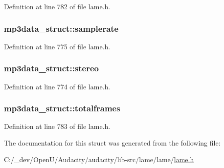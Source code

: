 Definition at line 782 of file lame.\+h.

\subsubsection[{\texorpdfstring{samplerate}{samplerate}}]{ mp3data\+\_\+struct\+::samplerate}\hypertarget{structmp3data__struct_a3289009b10c31e9890e4759cb26fb96b}{}\label{structmp3data__struct_a3289009b10c31e9890e4759cb26fb96b}


Definition at line 775 of file lame.\+h.

\subsubsection[{\texorpdfstring{stereo}{stereo}}]{ mp3data\+\_\+struct\+::stereo}\hypertarget{structmp3data__struct_ac315000298eb2b2312675d1c748dcd57}{}\label{structmp3data__struct_ac315000298eb2b2312675d1c748dcd57}


Definition at line 774 of file lame.\+h.

\subsubsection[{\texorpdfstring{totalframes}{totalframes}}]{ mp3data\+\_\+struct\+::totalframes}\hypertarget{structmp3data__struct_af16dae72aa0006605b45f3e8093ff6be}{}\label{structmp3data__struct_af16dae72aa0006605b45f3e8093ff6be}


Definition at line 783 of file lame.\+h.



The documentation for this struct was generated from the following file\+:\begin{DoxyCompactItemize}
\item 
C\+:/\+\_\+dev/\+Open\+U/\+Audacity/audacity/lib-\/src/lame/lame/\hyperlink{lame_8h}{lame.\+h}\end{DoxyCompactItemize}
